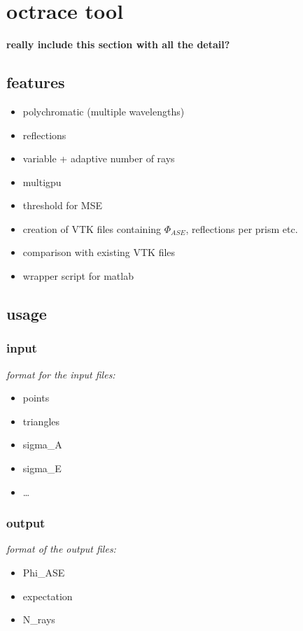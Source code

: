 \documentclass[a4paper,11pt]{article}
\begin{document}
\section{octrace tool}
\textbf{really include this section with all the detail?}
\subsection{features}
\begin{multicols}{2}
\begin{itemize}
  \item polychromatic (multiple wavelengths)
  \item reflections
  \item variable + adaptive number of rays
  \item multigpu
  \item threshold for MSE
  \item creation of VTK files containing $\Phi_{ASE}$, reflections per prism etc.
  \item comparison with existing VTK files 
  \item wrapper script for matlab
\end{itemize}
\end{multicols}

\subsection{usage}
\subsubsection{input}
\textit{format for the input files:}
\begin{multicols}{2}
\begin{itemize}
  \item points
  \item triangles
  \item sigma\_A
  \item sigma\_E
  \item \dots
\end{itemize}
\end{multicols}

\subsubsection{output}
\textit{format of the output files:}
\begin{multicols}{2}
\begin{itemize}
  \item Phi\_ASE
  \item expectation
  \item N\_rays
\end{itemize}
\end{multicols}
\end{document}
